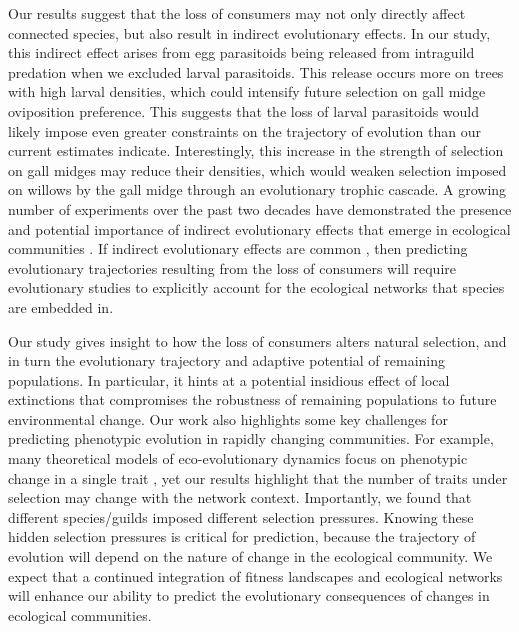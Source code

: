 \documentclass[11pt,]{article}
\begin{document}
Our results suggest that the loss of consumers may not only directly
affect connected species, but also result in indirect evolutionary
effects. In our study, this indirect effect arises from egg parasitoids
being released from intraguild predation when we excluded larval
parasitoids. This release occurs more on trees with high larval
densities, which could intensify future selection on gall midge
oviposition preference. This suggests that the loss of larval
parasitoids would likely impose even greater constraints on the
trajectory of evolution than our current estimates indicate.
Interestingly, this increase in the strength of selection on gall midges
may reduce their densities, which would weaken selection imposed on
willows by the gall midge through an evolutionary trophic cascade. A
growing number of experiments over the past two decades have
demonstrated the presence and potential importance of indirect
evolutionary effects that emerge in ecological communities
\citep{Pilson1996, Juenger1998, Stinchcombe2001, Lankau2007, Walsh2008, Walsh2010, terHorst2010, Sahli2011, Lau2012, terHorst2015, Schiestl2018, Start2019}.
If indirect evolutionary effects are common
\citep{Miller1996, Walsh2013, Guimaraes2017}, then predicting
evolutionary trajectories resulting from the loss of consumers will
require evolutionary studies to explicitly account for the ecological
networks that species are embedded in.

Our study gives insight to how the loss of consumers alters natural
selection, and in turn the evolutionary trajectory and adaptive
potential of remaining populations. In particular, it hints at a
potential insidious effect of local extinctions that compromises the
robustness of remaining populations to future environmental change. Our
work also highlights some key challenges for predicting phenotypic
evolution in rapidly changing communities. For example, many theoretical
models of eco-evolutionary dynamics focus on phenotypic change in a
single trait \citep[but see][]{Brown2007, Leimar2009}, yet our results
highlight that the number of traits under selection may change with the
network context. Importantly, we found that different species/guilds
imposed different selection pressures. Knowing these hidden selection
pressures is critical for prediction, because the trajectory of
evolution will depend on the nature of change in the ecological
community. We expect that a continued integration of fitness landscapes
and ecological networks will enhance our ability to predict the
evolutionary consequences of changes in ecological communities.
\end{document}
